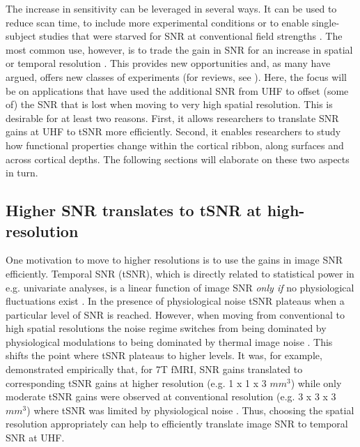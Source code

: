 The increase in sensitivity can be leveraged in several ways. It can be used to reduce scan time, to include more experimental conditions or to enable single-subject studies that were starved for SNR at conventional field strengths \parencite{Polimeni2017}. The most common use, however, is to trade the gain in SNR for an increase in spatial or temporal resolution \parencite{Polimeni2017}. This provides new opportunities and, as many have argued, offers new classes of experiments (for reviews, see \cite{Polimeni2017, DeMartino2016, Dumoulin2017}). Here, the focus will be on applications that have used the additional SNR from UHF to offset (some of) the SNR that is lost when moving to very high spatial resolution. This is desirable for at least two reasons. First, it allows researchers to translate SNR gains at UHF to tSNR more efficiently. Second, it enables researchers to study how functional properties change within the cortical ribbon, along surfaces and across cortical depths. The following sections will elaborate on these two aspects in turn.

\subsection{Higher SNR translates to tSNR at high-resolution}
One motivation to move to higher resolutions is to use the gains in image SNR efficiently. Temporal SNR (tSNR), which is directly related to statistical power in e.g. univariate analyses, is a linear function of image SNR \textit{only if} no physiological fluctuations exist \parencite{Murphy2007}. In the presence of physiological noise tSNR plateaus when a particular level of SNR is reached. However, when moving from conventional to high spatial resolutions the noise regime switches from being dominated by physiological modulations to being dominated by thermal image noise \parencite{Triantafyllou2005}. This shifts the point where tSNR plateaus to higher levels. It was, for example, demonstrated empirically that, for 7T fMRI, SNR gains translated to corresponding tSNR gains at higher resolution (e.g. 1 x 1 x 3 $mm^3$) while only moderate tSNR gains were observed at conventional resolution (e.g. 3 x 3 x 3 $mm^3$) where tSNR was limited by physiological noise \parencite{Triantafyllou2005}. Thus, choosing the spatial resolution appropriately can help to efficiently translate image SNR to temporal SNR at UHF.

